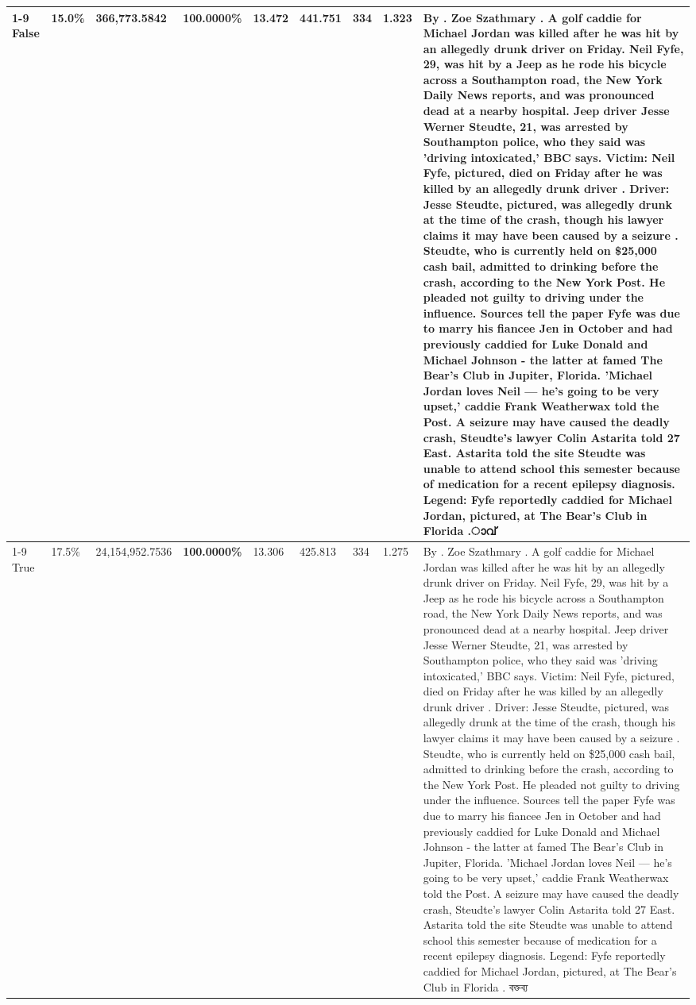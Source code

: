 \begin{table}[H]
\begin{tabular}{lllrlllll}
\cline{1-9}
False & 15.0\% & 366,773.5842 & \bfseries \color{red} 100.0000\% & 13.472 & 441.751 & 334 & 1.323 & By . Zoe Szathmary . A golf caddie for Michael Jordan was killed after he was hit by an allegedly drunk driver on Friday. Neil Fyfe, 29, was hit by a Jeep as he rode his bicycle across a Southampton road, the New York Daily News reports, and was pronounced dead at a nearby hospital. Jeep driver Jesse Werner Steudte, 21, was arrested by Southampton police, who they said was 'driving intoxicated,' BBC says. Victim: Neil Fyfe, pictured, died on Friday after he was killed by an allegedly drunk driver . Driver: Jesse Steudte, pictured, was allegedly drunk at the time of the crash, though his lawyer claims it may have been caused by a seizure . Steudte, who is currently held on \$25,000 cash bail, admitted to drinking before the crash, according to the New York Post. He pleaded not guilty to driving under the influence. Sources tell the paper Fyfe was due to marry his fiancee Jen in October and had previously caddied for Luke Donald and Michael Johnson - the latter at famed The Bear's Club in Jupiter, Florida. 'Michael Jordan loves Neil — he’s going to be very upset,' caddie Frank Weatherwax told the Post. A seizure may have caused the deadly crash, Steudte's lawyer Colin Astarita told 27 East. Astarita told the site Steudte was unable to attend school this semester because of medication for a recent epilepsy diagnosis. Legend: Fyfe reportedly caddied for Michael Jordan, pictured, at The Bear's Club in Florida .ാവ് \\
\cline{1-9}
True & 17.5\% & 24,154,952.7536 & \bfseries \color{red} 100.0000\% & 13.306 & 425.813 & 334 & 1.275 & By . Zoe Szathmary . A golf caddie for Michael Jordan was killed after he was hit by an allegedly drunk driver on Friday. Neil Fyfe, 29, was hit by a Jeep as he rode his bicycle across a Southampton road, the New York Daily News reports, and was pronounced dead at a nearby hospital. Jeep driver Jesse Werner Steudte, 21, was arrested by Southampton police, who they said was 'driving intoxicated,' BBC says. Victim: Neil Fyfe, pictured, died on Friday after he was killed by an allegedly drunk driver . Driver: Jesse Steudte, pictured, was allegedly drunk at the time of the crash, though his lawyer claims it may have been caused by a seizure . Steudte, who is currently held on \$25,000 cash bail, admitted to drinking before the crash, according to the New York Post. He pleaded not guilty to driving under the influence. Sources tell the paper Fyfe was due to marry his fiancee Jen in October and had previously caddied for Luke Donald and Michael Johnson - the latter at famed The Bear's Club in Jupiter, Florida. 'Michael Jordan loves Neil — he’s going to be very upset,' caddie Frank Weatherwax told the Post. A seizure may have caused the deadly crash, Steudte's lawyer Colin Astarita told 27 East. Astarita told the site Steudte was unable to attend school this semester because of medication for a recent epilepsy diagnosis. Legend: Fyfe reportedly caddied for Michael Jordan, pictured, at The Bear's Club in Florida . বক্তব্য \\

\end{tabular}
\end{table}
